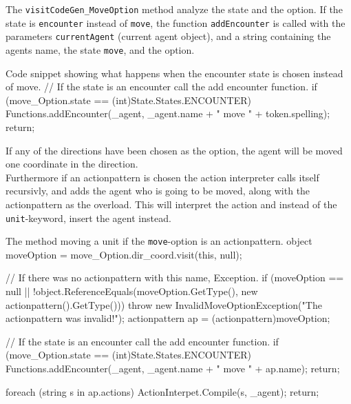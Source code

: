 The \texttt{visitCodeGen\_MoveOption} method analyze the state and the option. If the state is \texttt{encounter} instead of \texttt{move}, the function \texttt{addEncounter} is called with the parameters \texttt{currentAgent} (current agent object), and a string containing the agents name, the state \texttt{move}, and the option.\\

\begin{source}{Code snippet showing what happens when the encounter state is chosen instead of move.}{}
// If the state is an encounter call the add encounter function.
if (move_Option.state == (int)State.States.ENCOUNTER)
	{
		Functions.addEncounter(_agent, _agent.name + " move " + token.spelling);
		return;
	}
\end{source}

If any of the directions have been chosen as the option, the agent will be moved one coordinate in the direction.\\
Furthermore if an actionpattern is chosen the action interpreter calls itself recursivly, and adds the agent who is going to be moved, along with the actionpattern as the overload. This will interpret the action and instead of the \texttt{unit}-keyword, insert the agent instead.\\

\begin{source}{The method moving a unit if the \texttt{move}-option is an actionpattern.}{}
object moveOption = move_Option.dir_coord.visit(this, null);

// If there was no actionpattern with this name, Exception.
if (moveOption == null || !object.ReferenceEquals(moveOption.GetType(), new actionpattern().GetType()))
	{
		throw new InvalidMoveOptionException("The actionpattern was invalid!");
	}
actionpattern ap = (actionpattern)moveOption;

// If the state is an encounter call the add encounter function.
if (move_Option.state == (int)State.States.ENCOUNTER)
	{
		Functions.addEncounter(_agent, _agent.name + " move " + ap.name);
		return;
	}

foreach (string s in ap.actions)
	{
		ActionInterpet.Compile(s, _agent);
	}
return;
\end{source}